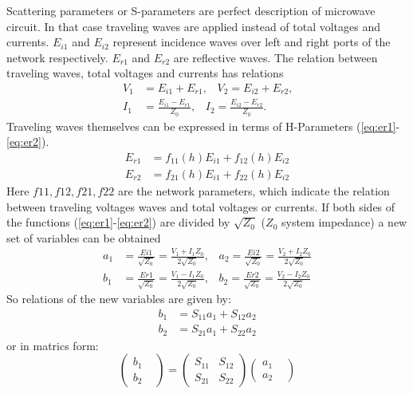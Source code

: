 Scattering parameters or S-parameters are perfect description of microwave circuit\cite{RF194_s_parameters}. In that case traveling waves are applied instead of total voltages and currents. $E_{i1}$ and $E_{i2}$ represent incidence waves over left and right ports of the network respectively. $E_{r1}$ and $E_{r2}$ are reflective waves. The relation between traveling waves, total voltages and currents has relations %
\begin{align}
V_{1}&=E_{i1}+E_{r1}\text{,}\quad V_{2}=E_{i2}+E_{r2}\text{,}
\label{eq:voltage_wave1}\\
I_{1}&=\frac{E_{i1}-E_{r1}}{Z_{0}}\text{,}\quad I_{2}=\frac{E_{i2}-E_{r2}}{Z_{0}}\text{.}
\label{eq:voltage_wave2}
\end{align}
Traveling waves themselves can be expressed in terms of H-Parameters (\ref{eq:er1}-\ref{eq:er2}). 
\begin{align}
E_{r1}&=f_{11}(h)E_{i1}+f_{12}(h)E_{i2}
\label{eq:er1}
\\
E_{r2}&=f_{21}(h)E_{i1}+f_{22}(h)E_{i2}
\label{eq:er2}
\end{align}
Here $f11, f12, f21, f22$ are the network parameters, which indicate the relation between traveling voltages waves and total voltages or currents. If both sides of the functions (\ref{eq:er1}-\ref{eq:er2}) are divided by $\sqrt{Z_{0}}$ ($Z_{0}$ system impedance) a new set of variables can be obtained
\begin{align} 
a_{1}&=\frac{Ei1}{\sqrt{Z_{0}}}=\frac{V_{1}+I_{1}Z_{0}}{2\sqrt{Z_{0}}} \text{,}\quad a_{2}=\frac{Ei2}{\sqrt{Z_{0}}}=\frac{V_{2}+I_{2}Z_{0}}{2\sqrt{Z_{0}}} \\
b_{1}&=\frac{Er1}{\sqrt{Z_{0}}}=\frac{V_{1}-I_{1}Z_{0}}{2\sqrt{Z_{0}}}  \text{,}\quad b_{2}=\frac{Er2}{\sqrt{Z_{0}}}=\frac{V_{2}-I_{2}Z_{0}}{2\sqrt{Z_{0}}}
\end{align}
So relations of the new variables are given by:
\begin{align}
b_{1}&=S_{11}a_{1}+S_{12}a_{2}\\
b_{2}&=S_{21}a_{1}+S_{22}a_{2}
\end{align}
or in matrics form:
\begin{equation}
		\begin{pmatrix}
			b_{1}&\\
			b_{2}&
		\end{pmatrix}
	=	
		\begin{pmatrix}
			S_{11}&S_{12}\\
			S_{21}&S_{22}
		\end{pmatrix}
		\begin{pmatrix}
			a_{1}&\\
			a_{2}&
		\end{pmatrix}
\label{eq:s_matrix}
\end{equation}

